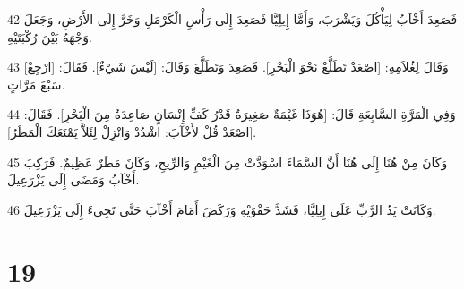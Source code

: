 \par 42 فَصَعِدَ أَخْآبُ لِيَأْكُلَ وَيَشْرَبَ، وَأَمَّا إِيلِيَّا فَصَعِدَ إِلَى رَأْسِ الْكَرْمَلِ وَخَرَّ إِلَى الأَرْضِ، وَجَعَلَ وَجْهَهُ بَيْنَ رُكْبَتَيْهِ.
\par 43 وَقَالَ لِغُلاَمِهِ: [اصْعَدْ تَطَلَّعْ نَحْوَ الْبَحْرِ]. فَصَعِدَ وَتَطَلَّعَ وَقَالَ: [لَيْسَ شَيْءٌ]. فَقَالَ: [ارْجِعْ] سَبْعَ مَرَّاتٍ.
\par 44 وَفِي الْمَرَّةِ السَّابِعَةِ قَالَ: [هُوَذَا غَيْمَةٌ صَغِيرَةٌ قَدْرُ كَفِّ إِنْسَانٍ صَاعِدَةٌ مِنَ الْبَحْرِ]. فَقَالَ: [اصْعَدْ قُلْ لأَخْآبَ: اشْدُدْ وَانْزِلْ لِئَلاَّ يَمْنَعَكَ الْمَطَرُ].
\par 45 وَكَانَ مِنْ هُنَا إِلَى هُنَا أَنَّ السَّمَاءَ اسْوَدَّتْ مِنَ الْغَيْمِ وَالرِّيحِ، وَكَانَ مَطَرٌ عَظِيمٌ. فَرَكِبَ أَخْآبُ وَمَضَى إِلَى يَزْرَعِيلَ.
\par 46 وَكَانَتْ يَدُ الرَّبِّ عَلَى إِيلِيَّا، فَشَدَّ حَقْوَيْهِ وَرَكَضَ أَمَامَ أَخْآبَ حَتَّى تَجِيءَ إِلَى يَزْرَعِيلَ.

\chapter{19}

